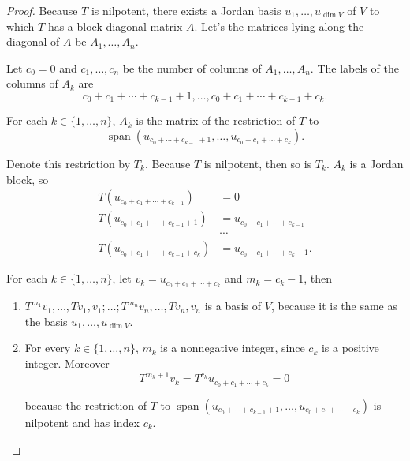 \begin{proof}
    Because $T$ is nilpotent, there exists a Jordan basis $u_{1}, \ldots, u_{\dim V}$ of $V$ to which $T$ has a block diagonal matrix $A$. Let's the matrices lying along the diagonal of $A$ be $A_{1}, \ldots, A_{n}$.

    Let $c_{0} = 0$ and $c_{1}, \ldots, c_{n}$ be the number of columns of $A_{1}, \ldots, A_{n}$. The labels of the columns of $A_{k}$ are
    \[
        c_{0} + c_{1} + \cdots + c_{k-1} + 1, \ldots, c_{0} + c_{1} + \cdots + c_{k-1} + c_{k}.
    \]

    For each $k\in\{1,\ldots,n\}$, $A_{k}$ is the matrix of the restriction of $T$ to
    \[
        \operatorname{span}(u_{c_{0} + \cdots + c_{k-1}+1}, \ldots, u_{c_{0} + c_{1} + \cdots + c_{k}}).
    \]

    Denote this restriction by $T_{k}$. Because $T$ is nilpotent, then so is $T_{k}$. $A_{k}$ is a Jordan block, so
    \begin{align*}
        T(u_{c_{0} + c_{1} + \cdots + c_{k-1}})         & = 0                                       \\
        T(u_{c_{0} + c_{1} + \cdots + c_{k-1} + 1})     & = u_{c_{0} + c_{1} + \cdots + c_{k-1}}    \\
                                                        & \cdots                                    \\
        T(u_{c_{0} + c_{1} + \cdots + c_{k-1} + c_{k}}) & = u_{c_{0} + c_{1} + \cdots + c_{k} - 1}.
    \end{align*}

    For each $k\in\{1,\ldots,n\}$, let $v_{k} = u_{c_{0} + c_{1} + \cdots + c_{k}}$ and $m_{k} = c_{k} - 1$, then
    \begin{enumerate}[label={(\alph*)}]
        \item $T^{m_{1}}v_{1}, \ldots, Tv_{1}, v_{1}; \ldots; T^{m_{n}}v_{n}, \ldots, Tv_{n}, v_{n}$ is a basis of $V$, because it is the same as the basis $u_{1}, \ldots, u_{\dim V}$.
        \item For every $k\in\{1,\ldots,n\}$, $m_{k}$ is a nonnegative integer, since $c_{k}$ is a positive integer. Moreover
              \[
                  T^{m_{k}+1}v_{k} = T^{c_{k}}u_{c_{0} + c_{1} + \cdots + c_{k}} = 0
              \]

              because the restriction of $T$ to $\operatorname{span}(u_{c_{0} + \cdots + c_{k-1}+1}, \ldots, u_{c_{0} + c_{1} + \cdots + c_{k}})$ is nilpotent and has index $c_{k}$.
    \end{enumerate}
\end{proof}
\newpage

